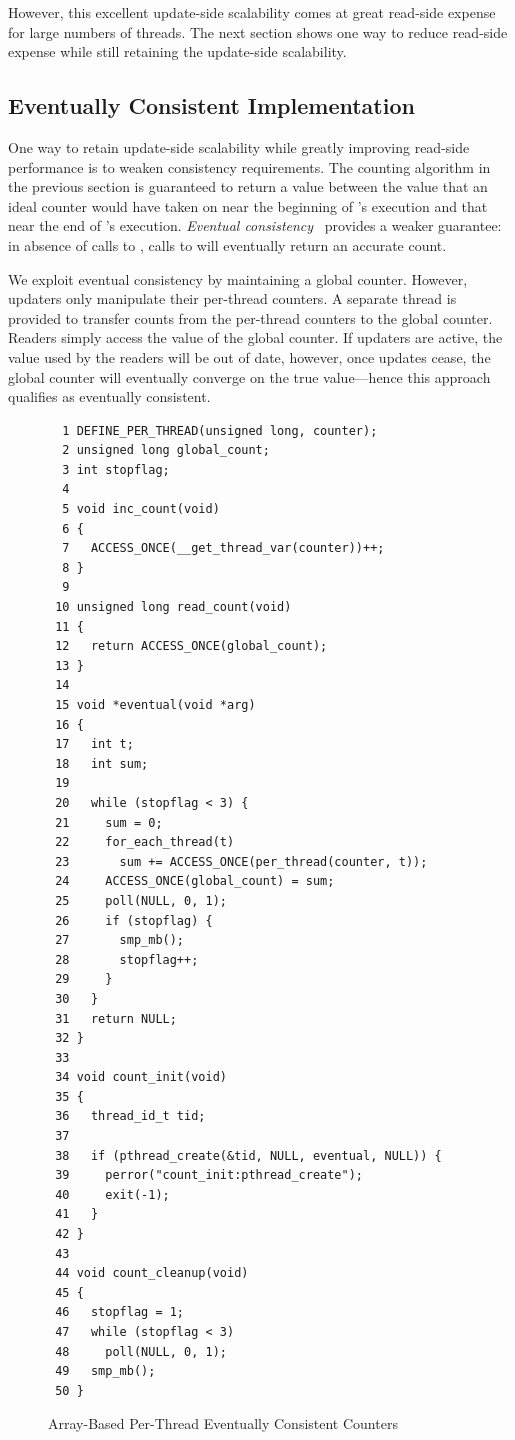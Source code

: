 However, this excellent update-side scalability comes at great read-side
expense for large numbers of threads.
The next section shows one way to reduce read-side expense while
still retaining the update-side scalability.

\subsection{Eventually Consistent Implementation}
\label{sec:count:Eventually Consistent Implementation}

One way to retain update-side scalability while greatly improving
read-side performance is to weaken consistency requirements.
The counting algorithm in the previous section is guaranteed to
return a value between the value that an ideal counter would have
taken on near the beginning of 's execution and
that near the end of 's execution.
\emph{Eventual consistency}~\cite{WernerVogels:2009:EventuallyConsistent}
provides a weaker
guarantee: in absence of calls to , calls to
 will eventually return an accurate count.

We exploit eventual consistency by maintaining a global counter.
However, updaters only manipulate their per-thread counters.
A separate thread is provided to transfer counts from the per-thread
counters to the global counter.
Readers simply access the value of the global counter.
If updaters are active, the value used by the readers will be out of
date, however, once updates cease, the global counter will eventually
converge on the true value---hence this approach qualifies as
eventually consistent.

\begin{figure}[tbp]
{ \scriptsize
\begin{verbatim}
  1 DEFINE_PER_THREAD(unsigned long, counter);
  2 unsigned long global_count;
  3 int stopflag;
  4 
  5 void inc_count(void)
  6 {
  7   ACCESS_ONCE(__get_thread_var(counter))++;
  8 }
  9 
 10 unsigned long read_count(void)
 11 {
 12   return ACCESS_ONCE(global_count);
 13 }
 14 
 15 void *eventual(void *arg)
 16 {
 17   int t;
 18   int sum;
 19 
 20   while (stopflag < 3) {
 21     sum = 0;
 22     for_each_thread(t)
 23       sum += ACCESS_ONCE(per_thread(counter, t));
 24     ACCESS_ONCE(global_count) = sum;
 25     poll(NULL, 0, 1);
 26     if (stopflag) {
 27       smp_mb();
 28       stopflag++;
 29     }
 30   }
 31   return NULL;
 32 }
 33 
 34 void count_init(void)
 35 {
 36   thread_id_t tid;
 37 
 38   if (pthread_create(&tid, NULL, eventual, NULL)) {
 39     perror("count_init:pthread_create");
 40     exit(-1);
 41   }
 42 }
 43 
 44 void count_cleanup(void)
 45 {
 46   stopflag = 1;
 47   while (stopflag < 3)
 48     poll(NULL, 0, 1);
 49   smp_mb();
 50 }
\end{verbatim}
}
\caption{Array-Based Per-Thread Eventually Consistent Counters}
\label{fig:count:Array-Based Per-Thread Eventually Consistent Counters}
\end{figure}

